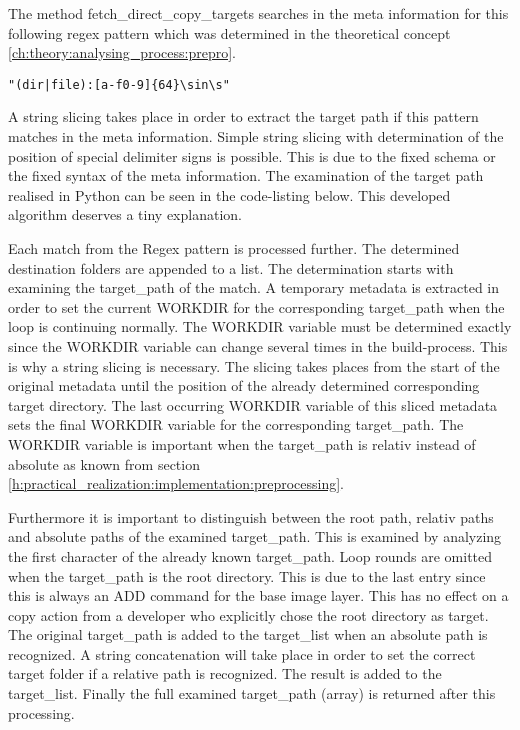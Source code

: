 The method fetch\_direct\_copy\_targets searches in the meta information for this following regex pattern which was determined in the theoretical concept \ref{ch:theory:analysing_process:prepro}.
\begin{lstlisting}
"(dir|file):[a-f0-9]{64}\sin\s"
\end{lstlisting}
A string slicing takes place in order to extract the target path if this pattern matches in the meta information. 
Simple string slicing with determination of the position of special delimiter signs is possible. This is due to the fixed schema or the fixed syntax of the meta information.
The examination of the target path realised in Python can be seen in the code-listing below.
This developed algorithm deserves a tiny explanation.

Each match from the Regex pattern is processed further. The determined destination folders are appended to a list. The determination starts with examining the target\_path of the match. 
A temporary metadata is extracted in order to set the current WORKDIR for the corresponding target\_path when the loop is continuing normally. 
The WORKDIR variable must be determined exactly since the WORKDIR variable can change several times in the build-process. This is why a string slicing is necessary. The slicing takes places from the start of the original metadata until the position of the already determined corresponding target directory. 
The last occurring WORKDIR variable of this sliced metadata sets the final WORKDIR variable for the corresponding target\_path. The WORKDIR variable is important when the target\_path is relativ instead of absolute as known from section \ref{h:practical_realization:implementation:preprocessing}.

Furthermore it is important to distinguish between the root path, relativ paths and absolute paths of the examined target\_path. This is examined by analyzing the first character of the already known target\_path. 
Loop rounds are omitted when the target\_path is the root directory. This is due to the last entry since this is always an ADD command for the base image layer. This has no effect on a copy action from a developer who explicitly chose the root directory as target.
The original target\_path is added to the target\_list when an absolute path is recognized. 
A string concatenation will take place in order to set the correct target folder if a relative path is recognized. The result is added to the target\_list.
Finally the full examined target\_path (array) is returned after this processing.

